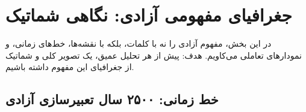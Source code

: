 \section{جغرافیای مفهومی آزادی: نگاهی شماتیک}
\label{sec:schematic}

\begin{tcolorbox}[wavebox, title={درباره‌ی این بخش}]
در این بخش، مفهوم آزادی را نه با کلمات، بلکه با نقشه‌ها، خط‌های زمانی، و نمودارهای تعاملی می‌کاویم. هدف: پیش از هر تحلیل عمیق، یک تصویر کلی و شماتیک از جغرافیای این مفهوم داشته باشیم.
\end{tcolorbox}

\subsection{خط زمانی: ۲۵۰۰ سال تعبیرسازی آزادی}
\label{subsec:timeline}

